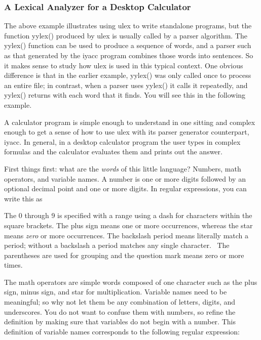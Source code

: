 \subsubsection{A Lexical Analyzer for a Desktop Calculator}

The above example illustrates using \textsf{ulex} to write standalone
programs, but the function \textsf{yylex()} produced by \textsf{ulex}
is usually called by a parser algorithm. The \textsf{yylex()} function
can be used to produce a sequence of words, and a parser such as that
generated by the \textsf{iyacc} program combines those words into
sentences. So it makes sense to study how \textsf{ulex} is used in this
typical context. One obvious difference is that in the earlier example,
\textsf{yylex()} was only called once to process an entire file; in
contrast, when a parser uses \textsf{yylex()} it calls it repeatedly,
and \textsf{yylex()} returns with each word that it finds. You will see
this in the following example.

A calculator program is simple enough to understand in one sitting and
complex enough to get a sense of how to use \textsf{ulex} with its
parser generator counterpart, \textsf{iyacc}. In general, in a desktop
calculator program the user types in complex formulas and the
calculator evaluates them and prints out the answer.

First things first: what are the \textit{words} of this little language?
Numbers, math operators, and variable names. A number is one or more
digits followed by an optional decimal point and one or more digits. In
regular expressions, you can write this as


The 0 through 9 is specified with a range using a dash for characters
within the square brackets. The plus sign means one or more
occurrences, whereas the star means \textit{zero} or more occurrences.
The backslash period means literally match a period; without a
backslash a period matches any single character. \ The parentheses are
used for grouping and the question mark means zero or more times.

The math operators are simple {\textquotedbl}words{\textquotedbl}
composed of one character such as the plus sign, minus sign, and star
for multiplication. Variable names need to be meaningful; so why not
let them be any combination of letters, digits, and underscores. You do
not want to confuse them with numbers, so refine the definition by
making sure that variables do not begin with a number. This definition
of variable names corresponds to the following regular expression: 

